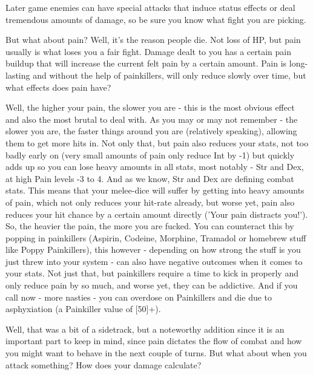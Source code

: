 Later game enemies can have special attacks that induce status effects or deal tremendous amounts of damage, so be sure you know what fight you are picking.

But what about pain? Well, it's the reason people die. Not loss of HP, but pain usually is what loses you a fair fight. Damage dealt to you has a certain pain buildup that will increase the current felt pain by a certain amount. Pain is long-lasting and without the help of painkillers, will only reduce slowly over time, but what effects does pain have?

Well, the higher your pain, the slower you are - this is the most obvious effect and also the most brutal to deal with. As you may or may not remember - the slower you are, the faster things around you are (relatively speaking), allowing them to get more hits in. Not only that, but pain also reduces your stats, not too badly early on (very small amounts of pain only reduce Int by -1) but quickly adds up so you can lose heavy amounts in all stats, most notably - Str and Dex, at high Pain levels -3 to 4. And as we know, Str and Dex are defining combat stats. This means that your melee-dice will suffer by getting into heavy amounts of pain, which not only reduces your hit-rate already, but worse yet, pain also reduces your hit chance by a certain amount directly ('Your pain distracts you!'). So, the heavier the pain, the more you are fucked. You can counteract this by popping in painkillers (Aspirin, Codeine, Morphine, Tramadol or homebrew stuff like Poppy Painkillers), this however - depending on how strong the stuff is you just threw into your system - can also have negative outcomes when it comes to your stats. Not just that, but painkillers require a time to kick in properly and only reduce pain by so much, and worse yet, they can be addictive. And if you call now - more nasties - you can overdose on Painkillers and die due to asphyxiation (a Painkiller value of [50]+).

Well, that was a bit of a sidetrack, but a noteworthy addition since it is an important part to keep in mind, since pain dictates the flow of combat and how you might want to behave in the next couple of turns. But what about when you attack something? How does your damage calculate?

